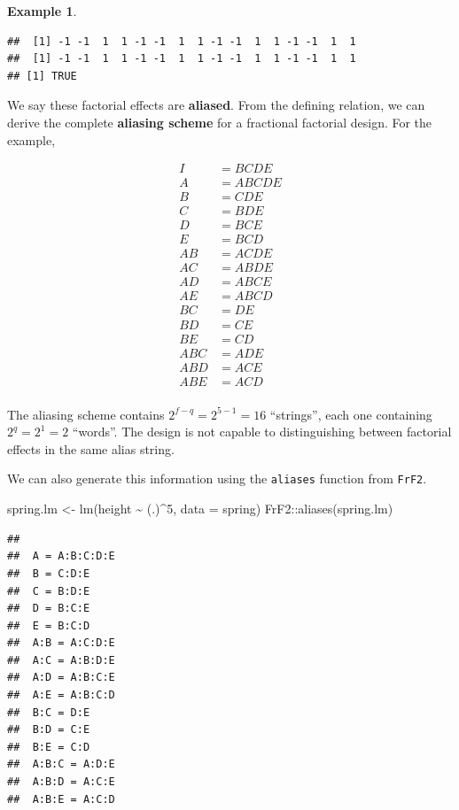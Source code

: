 \documentclass[
]{book}
\newenvironment{Shaded}{\begin{snugshade}}{\end{snugshade}}
\newcommand{\AttributeTok}[1]{\textcolor[rgb]{0.77,0.63,0.00}{#1}}
\newcommand{\DecValTok}[1]{\textcolor[rgb]{0.00,0.00,0.81}{#1}}
\newcommand{\FunctionTok}[1]{\textcolor[rgb]{0.00,0.00,0.00}{#1}}
\newcommand{\NormalTok}[1]{#1}
\newcommand{\OtherTok}[1]{\textcolor[rgb]{0.56,0.35,0.01}{#1}}
\newcommand{\SpecialCharTok}[1]{\textcolor[rgb]{0.00,0.00,0.00}{#1}}
\theoremstyle{definition}
\theoremstyle{definition}
\newtheorem{example}{Example}[chapter]
\theoremstyle{definition}
\theoremstyle{definition}
\theoremstyle{remark}
\begin{document}
\begin{example}
\begin{verbatim}
##  [1] -1 -1  1  1 -1 -1  1  1 -1 -1  1  1 -1 -1  1  1
##  [1] -1 -1  1  1 -1 -1  1  1 -1 -1  1  1 -1 -1  1  1
## [1] TRUE
\end{verbatim}

We say these factorial effects are \textbf{aliased}. From the defining relation, we can derive the complete \textbf{aliasing scheme} for a fractional factorial design. For the example,

\begin{align}
I & = BCDE \\
A & = ABCDE \\
B & = CDE \\
C & = BDE \\
D & = BCE \\
E & = BCD \\
AB & = ACDE \\
AC & = ABDE \\
AD & = ABCE \\
AE & = ABCD \\
BC & = DE \\
BD & = CE \\
BE & = CD \\
ABC & = ADE \\
ABD & = ACE \\
ABE & = ACD \\
\end{align}

The aliasing scheme contains \(2^{f-q} = 2^{5-1} = 16\) ``strings'', each one containing \(2^q = 2^1 = 2\) ``words''. The design is not capable to distinguishing between factorial effects in the same alias string.

We can also generate this information using the \texttt{aliases} function from \texttt{FrF2}.

\begin{Shaded}
\begin{Highlighting}[]
\NormalTok{spring.lm }\OtherTok{\textless{}{-}} \FunctionTok{lm}\NormalTok{(height }\SpecialCharTok{\textasciitilde{}}\NormalTok{ (.)}\SpecialCharTok{\^{}}\DecValTok{5}\NormalTok{, }\AttributeTok{data =}\NormalTok{ spring)}
\NormalTok{FrF2}\SpecialCharTok{::}\FunctionTok{aliases}\NormalTok{(spring.lm)}
\end{Highlighting}
\end{Shaded}

\begin{verbatim}
##               
##  A = A:B:C:D:E
##  B = C:D:E    
##  C = B:D:E    
##  D = B:C:E    
##  E = B:C:D    
##  A:B = A:C:D:E
##  A:C = A:B:D:E
##  A:D = A:B:C:E
##  A:E = A:B:C:D
##  B:C = D:E    
##  B:D = C:E    
##  B:E = C:D    
##  A:B:C = A:D:E
##  A:B:D = A:C:E
##  A:B:E = A:C:D
\end{verbatim}

\end{example}
\end{document}
